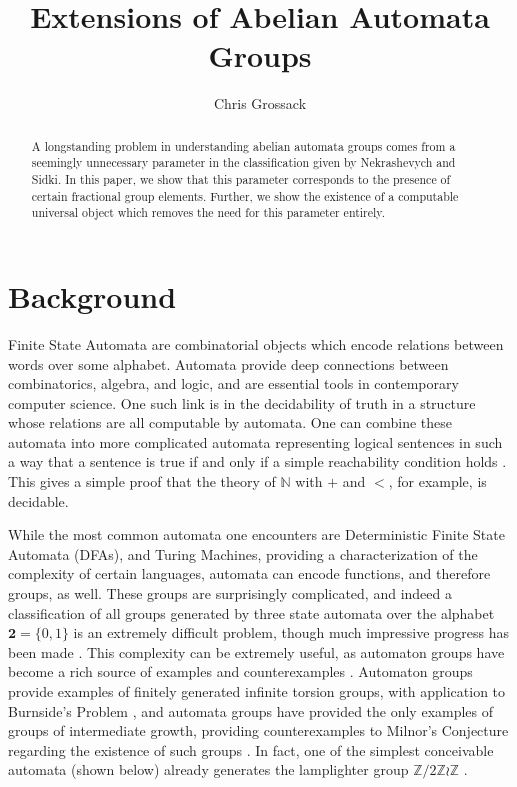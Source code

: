 \documentclass{article}
\title{Extensions of Abelian Automata Groups}
\author{Chris Grossack}
\newcommand{\Z}{\mathbb{Z}}
\newcommand{\2}{\textbf{2}}
\theoremstyle{definition}
\begin{document}
\maketitle

\begin{abstract}
  A longstanding problem in understanding abelian automata groups
  comes from a seemingly unnecessary parameter in the classification
  given by Nekrashevych and Sidki. In this paper, we show that
  this parameter corresponds to the presence of certain fractional group
  elements. Further, we show the existence of a computable universal object 
  which removes the need for this parameter entirely.
\end{abstract}


\section{Background}
Finite State Automata are combinatorial objects which encode relations 
between words over some alphabet. Automata provide deep connections between
combinatorics, algebra, and logic, and are essential tools in contemporary 
computer science. One such link is in the decidability of truth in a structure
whose relations are all computable by automata. One can combine these automata 
into more complicated automata representing logical sentences in such a way 
that a sentence is true if and only if a simple reachability condition holds
\cite{Brny07:automatic_structures}. This gives a simple proof that the theory 
of $\mathbb{N}$ with $+$ and $<$, for example, is decidable.

While the most common automata one encounters are Deterministic Finite State
Automata (DFAs), and Turing Machines, providing a characterization of the 
complexity of certain languages, automata can encode functions, and therefore 
groups, as well. These groups are surprisingly complicated, and indeed a 
classification of all groups generated by three state automata over the 
alphabet $\2 = \{0,1\}$ is an extremely difficult problem, though much
impressive progress has been made \cite{Bondarenko09:three_state}. This
complexity can be extremely useful, as automaton groups have become a rich
source of examples and counterexamples
\cite{Nekrashevych05:self_similar_groups%
     ,Sidki00:one_rooted_trees%
     ,GrigorchukNS00:automata_groups%
     }. 
Automaton groups provide examples of
finitely generated infinite torsion groups, with application to 
Burnside's Problem \cite{Gupta83:burnside}, and automata groups have
provided the only examples of groups of intermediate growth, providing 
counterexamples to Milnor's Conjecture regarding the existence of such groups
\cite{Grigorchuk11:Milnor}. In fact, one of the simplest conceivable automata 
(shown below) already generates the lamplighter group $\Z/2\Z \wr \Z$
\cite{GrigorchukZuk01:lamplighter}.
\end{document}
